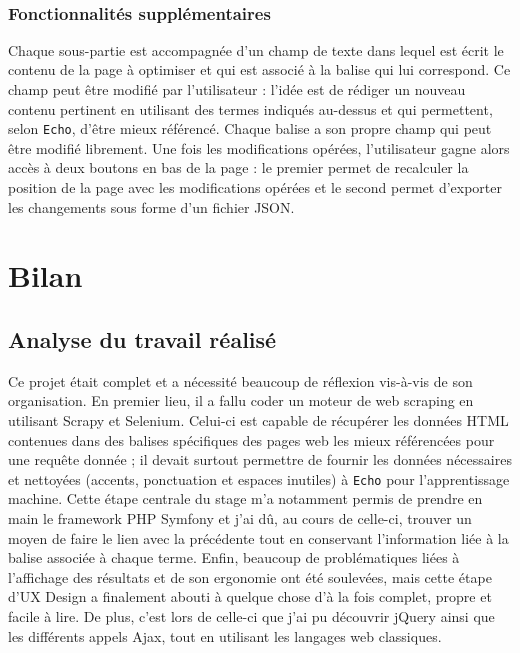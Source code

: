 \documentclass[12pt]{article}
\begin{document}
\

\subsubsection{Fonctionnalités supplémentaires}

Chaque sous-partie est accompagnée d'un champ de texte dans lequel est écrit le contenu de la page à optimiser et qui est associé à la balise qui lui correspond. Ce champ peut être modifié par l'utilisateur : l'idée est de rédiger un nouveau contenu pertinent en utilisant des termes indiqués au-dessus et qui permettent, selon \texttt{Echo}, d'être mieux référencé. Chaque balise a son propre champ qui peut être modifié librement. Une fois les modifications opérées, l'utilisateur gagne alors accès à deux boutons en bas de la page : le premier permet de recalculer la position de la page avec les modifications opérées et le second permet d'exporter les changements sous forme d'un fichier \textsf{JSON}.


\newpage
\section{Bilan}

\subsection{Analyse du travail réalisé}

Ce projet était complet et a nécessité beaucoup de réflexion vis-à-vis de son organisation. En premier lieu, il a fallu coder un moteur de web scraping en utilisant \textsf{Scrapy} et \textsf{Selenium}. Celui-ci est capable de récupérer les données HTML contenues dans des balises spécifiques des pages web les mieux référencées pour une requête donnée ; il devait surtout permettre de fournir les données nécessaires et nettoyées (accents, ponctuation et espaces inutiles) à \texttt{Echo} pour l'apprentissage machine. Cette étape centrale du stage m'a notamment permis de prendre en main le framework \textsf{PHP Symfony} et j'ai dû, au cours de celle-ci, trouver un moyen de faire le lien avec la précédente tout en conservant l'information liée à la balise associée à chaque terme. Enfin, beaucoup de problématiques liées à l'affichage des résultats et de son ergonomie ont été soulevées, mais cette étape d'UX Design a finalement abouti à quelque chose d'à la fois complet, propre et facile à lire. De plus, c'est lors de celle-ci que j'ai pu découvrir \textsf{jQuery} ainsi que les différents appels \textsf{Ajax}, tout en utilisant les langages web classiques.
\end{document}
